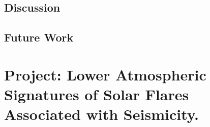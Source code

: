 \subsection{Discussion}





\subsection{Future Work}




\section{Project: Lower Atmospheric Signatures of Solar Flares Associated with Seismicity.}\label{PRJ}


